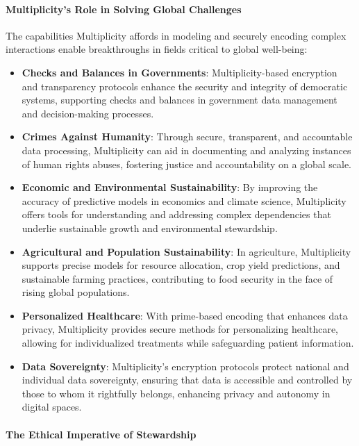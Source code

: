 \documentclass{article}
\theoremstyle{plain}
\begin{document}
\paragraph{Multiplicity's Role in Solving Global Challenges}

The capabilities Multiplicity affords in modeling and securely encoding complex interactions enable breakthroughs in fields critical to global well-being:
\begin{itemize}
    \item \textbf{Checks and Balances in Governments}: Multiplicity-based encryption and transparency protocols enhance the security and integrity of democratic systems, supporting checks and balances in government data management and decision-making processes.
    \item \textbf{Crimes Against Humanity}: Through secure, transparent, and accountable data processing, Multiplicity can aid in documenting and analyzing instances of human rights abuses, fostering justice and accountability on a global scale.
    \item \textbf{Economic and Environmental Sustainability}: By improving the accuracy of predictive models in economics and climate science, Multiplicity offers tools for understanding and addressing complex dependencies that underlie sustainable growth and environmental stewardship.
    \item \textbf{Agricultural and Population Sustainability}: In agriculture, Multiplicity supports precise models for resource allocation, crop yield predictions, and sustainable farming practices, contributing to food security in the face of rising global populations.
    \item \textbf{Personalized Healthcare}: With prime-based encoding that enhances data privacy, Multiplicity provides secure methods for personalizing healthcare, allowing for individualized treatments while safeguarding patient information.
    \item \textbf{Data Sovereignty}: Multiplicity’s encryption protocols protect national and individual data sovereignty, ensuring that data is accessible and controlled by those to whom it rightfully belongs, enhancing privacy and autonomy in digital spaces.
\end{itemize}

\paragraph{The Ethical Imperative of Stewardship}
\end{document}
